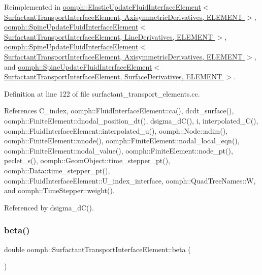 Reimplemented in \hyperlink{classoomph_1_1ElasticUpdateFluidInterfaceElement_a15c3d2912325ace17676366c1469121f}{oomph\+::\+Elastic\+Update\+Fluid\+Interface\+Element$<$ Surfactant\+Transport\+Interface\+Element, Axisymmetric\+Derivatives, E\+L\+E\+M\+E\+N\+T $>$}, \hyperlink{classoomph_1_1SpineUpdateFluidInterfaceElement_a3958845051cafecd8e73745fc04c7a78}{oomph\+::\+Spine\+Update\+Fluid\+Interface\+Element$<$ Surfactant\+Transport\+Interface\+Element, Line\+Derivatives, E\+L\+E\+M\+E\+N\+T $>$}, \hyperlink{classoomph_1_1SpineUpdateFluidInterfaceElement_a3958845051cafecd8e73745fc04c7a78}{oomph\+::\+Spine\+Update\+Fluid\+Interface\+Element$<$ Surfactant\+Transport\+Interface\+Element, Axisymmetric\+Derivatives, E\+L\+E\+M\+E\+N\+T $>$}, and \hyperlink{classoomph_1_1SpineUpdateFluidInterfaceElement_a3958845051cafecd8e73745fc04c7a78}{oomph\+::\+Spine\+Update\+Fluid\+Interface\+Element$<$ Surfactant\+Transport\+Interface\+Element, Surface\+Derivatives, E\+L\+E\+M\+E\+N\+T $>$}.



Definition at line 122 of file surfactant\+\_\+transport\+\_\+elements.\+cc.



References C\+\_\+index, oomph\+::\+Fluid\+Interface\+Element\+::ca(), dcdt\+\_\+surface(), oomph\+::\+Finite\+Element\+::dnodal\+\_\+position\+\_\+dt(), dsigma\+\_\+d\+C(), i, interpolated\+\_\+\+C(), oomph\+::\+Fluid\+Interface\+Element\+::interpolated\+\_\+u(), oomph\+::\+Node\+::ndim(), oomph\+::\+Finite\+Element\+::nnode(), oomph\+::\+Finite\+Element\+::nodal\+\_\+local\+\_\+eqn(), oomph\+::\+Finite\+Element\+::nodal\+\_\+value(), oomph\+::\+Finite\+Element\+::node\+\_\+pt(), peclet\+\_\+s(), oomph\+::\+Geom\+Object\+::time\+\_\+stepper\+\_\+pt(), oomph\+::\+Data\+::time\+\_\+stepper\+\_\+pt(), oomph\+::\+Fluid\+Interface\+Element\+::\+U\+\_\+index\+\_\+interface, oomph\+::\+Quad\+Tree\+Names\+::W, and oomph\+::\+Time\+Stepper\+::weight().



Referenced by dsigma\+\_\+d\+C().

\mbox{\label{classoomph_1_1SurfactantTransportInterfaceElement_a79003d87401ad6106b8d10373ff12e73}} 
\subsubsection{\texorpdfstring{beta()}{beta()}}
{\footnotesize\ttfamily double oomph\+::\+Surfactant\+Transport\+Interface\+Element\+::beta (\begin{DoxyParamCaption}{ }\end{DoxyParamCaption})\hspace{0.3cm}{\ttfamily [inline]}}



